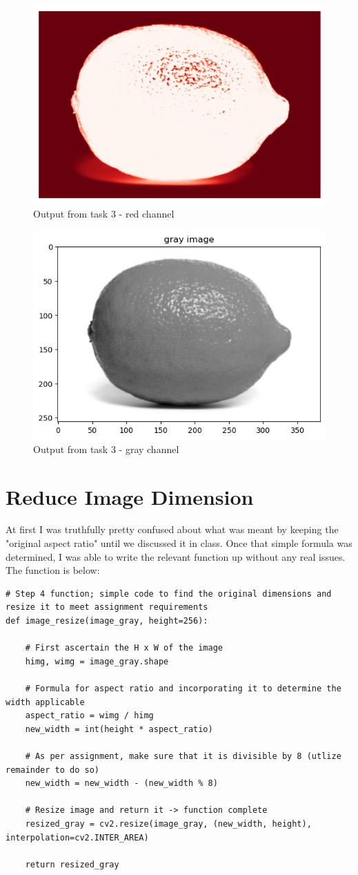 \documentclass[conference]{IEEEtran} %
\begin{document}
\begin{figure}[H]
    \centering
    \includegraphics[width=0.5\linewidth]{Task3Output/red3.png}
    \caption{Output from task 3 - red channel}
    \label{fig:red3}
\end{figure}

\begin{figure}[H]
    \centering
    \includegraphics[width=0.5\linewidth]{Task3Output/gray3.png}
    \caption{Output from task 3 - gray channel}
    \label{fig:gray3}
\end{figure}

\section{Reduce Image Dimension}
At first I was truthfully pretty confused about what was meant by keeping the "original aspect ratio" until we discussed it in class.  Once that simple formula was determined, I was able to write the relevant function up without any real issues.  The function is below:
\begin{lstlisting}
# Step 4 function; simple code to find the original dimensions and resize it to meet assignment requirements
def image_resize(image_gray, height=256):
    
    # First ascertain the H x W of the image
    himg, wimg = image_gray.shape
    
    # Formula for aspect ratio and incorporating it to determine the width applicable
    aspect_ratio = wimg / himg
    new_width = int(height * aspect_ratio)
    
    # As per assignment, make sure that it is divisible by 8 (utlize remainder to do so)
    new_width = new_width - (new_width % 8)
    
    # Resize image and return it -> function complete
    resized_gray = cv2.resize(image_gray, (new_width, height), interpolation=cv2.INTER_AREA)
    
    return resized_gray
\end{lstlisting}
\end{document}
